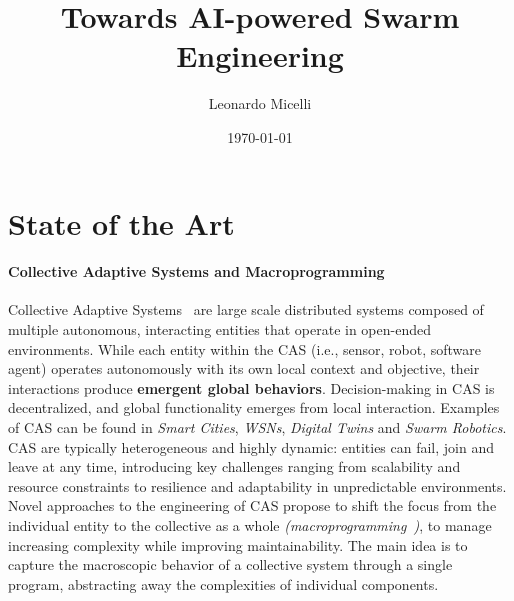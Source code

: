 \documentclass[12pt]{article}
\begin{document}
\title{Towards AI-powered Swarm Engineering}
\author{Leonardo Micelli}
\date{\today}
\maketitle

\noindent


\setcounter{tocdepth}{2}

\setlength{\parindent}{0em}
\setlength{\parskip}{1em}

\section{State of the Art}
\paragraph{\textbf{Collective Adaptive Systems and Macroprogramming}} Collective Adaptive Systems~\cite{ferscha2015collective} are large scale distributed systems composed of multiple autonomous, 
interacting entities that operate in open-ended environments. While each entity within the CAS (i.e., sensor, robot, software agent) operates autonomously with its own local context and objective, their interactions
produce \textbf{emergent global behaviors}. Decision-making in CAS is decentralized, and global functionality emerges from local interaction. Examples of CAS can be found in \textit{Smart Cities}, \textit{WSNs}, \textit{Digital Twins} and \textit{Swarm Robotics}.
CAS are typically heterogeneous and highly dynamic: entities can fail, join and leave at any time, introducing key challenges ranging from scalability and resource constraints to resilience and adaptability in
unpredictable environments. Novel approaches to the engineering of CAS propose to shift the focus from the individual entity to the collective as a whole \textit{(macroprogramming~\cite{10.1145/3579353})}, to manage increasing complexity while
improving maintainability. The main idea is to capture the macroscopic behavior of a collective system through a single program, abstracting away the complexities of individual components.
\end{document}

